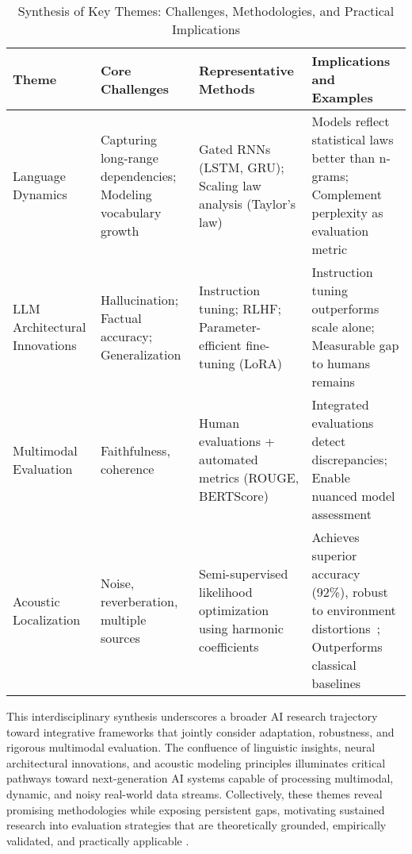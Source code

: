 \documentclass[sigconf]{acmart}
\begin{document}
\begin{table*}[htbp]
\centering
\caption{Synthesis of Key Themes: Challenges, Methodologies, and Practical Implications}
\label{tab:key-themes}
\begin{adjustbox}{max width=\textwidth}
\begin{tabular}{@{}llll@{}}
\toprule
\textbf{Theme} & \textbf{Core Challenges} & \textbf{Representative Methods} & \textbf{Implications and Examples} \\
\midrule
Language Dynamics & Capturing long-range dependencies; Modeling vocabulary growth & Gated RNNs (LSTM, GRU); Scaling law analysis (Taylor’s law) & Models reflect statistical laws better than n-grams; Complement perplexity as evaluation metric~\cite{ref51} \\
\addlinespace
LLM Architectural Innovations & Hallucination; Factual accuracy; Generalization & Instruction tuning; RLHF; Parameter-efficient fine-tuning (LoRA) & Instruction tuning outperforms scale alone; Measurable gap to humans remains~\cite{ref1,ref10} \\
\addlinespace
Multimodal Evaluation & Faithfulness, coherence & Human evaluations + automated metrics (ROUGE, BERTScore) & Integrated evaluations detect discrepancies; Enable nuanced model assessment~\cite{ref1,ref10,ref51} \\
\addlinespace
Acoustic Localization & Noise, reverberation, multiple sources & Semi-supervised likelihood optimization using harmonic coefficients & Achieves superior accuracy (92\%), robust to environment distortions~\cite{ref52}; Outperforms classical baselines \\
\bottomrule
\end{tabular}
\end{adjustbox}
\end{table*}

This interdisciplinary synthesis underscores a broader AI research trajectory toward integrative frameworks that jointly consider adaptation, robustness, and rigorous multimodal evaluation. The confluence of linguistic insights, neural architectural innovations, and acoustic modeling principles illuminates critical pathways toward next-generation AI systems capable of processing multimodal, dynamic, and noisy real-world data streams. Collectively, these themes reveal promising methodologies while exposing persistent gaps, motivating sustained research into evaluation strategies that are theoretically grounded, empirically validated, and practically applicable \cite{ref1,ref26}.
\end{document}
